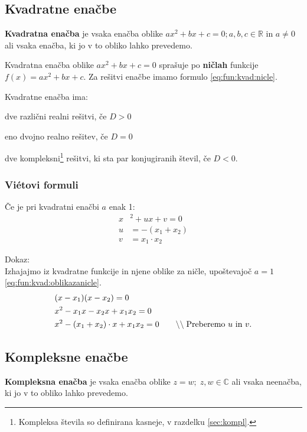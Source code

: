 \documentclass[a4paper,oneside,12pt,fleqn]{article}
\def\R{\ensuremath{\mathbb R}}
\def\C{\ensuremath{\mathbb C}}
\newcommand\krat\cdot
\newcommand{\comment}[1]{\ensuremath{\qquad\backslash\backslash\;}\textnormal{#1}}
\numberwithin{equation}{section}
\newenvironment{itemize*}%
{
\vspace{-12pt}%
\begin{itemize}%
\setlength{\itemsep}{0pt}%
\setlength{\parskip}{2pt}}%
{\end{itemize}}
\begin{document}
\subsection{Kvadratne enačbe}
\label{sec:enac:kvad}
\textbf{Kvadratna enačba} je vsaka enačba oblike $ax^2 + bx + c = 0; a, b, c \in \R$ in $a \neq 0$
ali vsaka enačba, ki jo v to obliko lahko prevedemo.

Kvadratna enačba oblike $ax^2 + bx + c = 0$ sprašuje po \textbf{ničlah} funkcije $f(x) = ax^2 + bx
+ c$. Za rešitvi enačbe imamo formulo \eqref{eq:fun:kvad:nicle}.

Kvadratne enačba ima:
\begin{itemize*}
  \item dve različni realni rešitvi, če $D > 0$
  \item eno dvojno realno rešitev, če $D = 0$
  \item dve kompleksni\footnote{Kompleksa števila so definirana kasneje, v razdelku
    \ref{sec:kompl}.\label{fn:komplnotyet}} rešitvi, ki sta par konjugiranih števil, če $D < 0$.
\end{itemize*}

\subsubsection{Vi\'{e}tovi formuli}
\label{sec:enac:kvad:viet}
Če je pri kvadratni enačbi $a$ enak 1:
\begin{align*}
  x&^2 + ux + v = 0 \\
  u& = -(x_1 + x_2) \\
  v& = x_1 \krat x_2
\end{align*}

Dokaz:\\
Izhajajmo iz kvadratne funkcije in njene oblike za ničle, upoštevajoč $a = 1$
\eqref{eq:fun:kvad:oblikazanicle}.
\begin{align*}
  &(x-x_1)(x-x_2) =  0 \\
  &x^2 - x_1x-x_2x +x_1x_2 = 0 \\
  &x^2 - (x_1+x_2) \krat x + x_1x_2 = 0 \comment{Preberemo $u$ in $v$.}
\end{align*}

\subsection{Kompleksne enačbe}
\label{sec:enac:kompl}
\textbf{Kompleksna enačba} je vsaka enačba oblike $z = w;\; z, w \in \C$ ali vsaka neenačba, ki jo v
to obliko lahko prevedemo.
\end{document}
